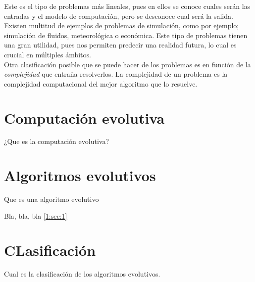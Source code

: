 Este es el tipo de problemas más lineales, pues en ellos se conoce cuales serán las entradas y el modelo de computación, pero se desconoce cual será la salida. \\

Existen multitud de ejemplos de problemas de simulación, como por ejemplo; simulación de fluidos, meteorológica o económica. Este tipo de problemas tienen una gran utilidad, pues nos permiten predecir una realidad futura, lo cual es crucial en múltiples ámbitos. \\


Otra clasificación posible que se puede hacer de los problemas es en función de la \textit{complejidad} que entraña resolverlos. La complejidad de un problema es la complejidad computacional del mejor algoritmo que lo resuelve. \\


\section{Computación evolutiva}
\label{1:sec:2}

¿Que es la computación evolutiva?

\section{Algoritmos evolutivos}
\label{1:sec:3}

Que es una algoritmo evolutivo

Bla, bla, bla  \ref{1:sec:1}

\section{CLasificación}
\label{1:sec:4}

Cual es la clasificación de los algoritmos evolutivos.
